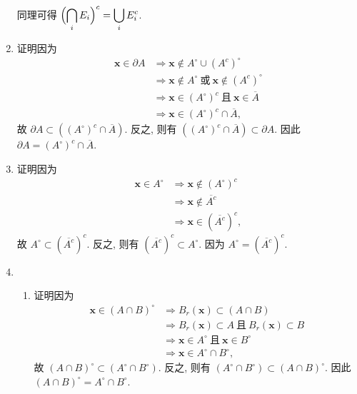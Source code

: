 \begin{enumerate}
        同理可得 $\displaystyle{\Bigl(\bigcap_i E_i\Bigr)^c = \bigcup_i E_i^c}$.
    \item %
        {\heiti 证明}\quad 因为
        \begin{align*}
            \boldsymbol{x} \in \partial{A} &\Rightarrow{} \boldsymbol{x} \notin A^\circ \cup (A^c)^\circ \\
            &\Rightarrow{} \boldsymbol{x} \notin A^\circ\ \text{或}\ \boldsymbol{x} \notin (A^c)^\circ \\
            &\Rightarrow{} \boldsymbol{x} \in (A^\circ)^c\ \text{且}\ \boldsymbol{x} \in \overline{A} \\
            &\Rightarrow{} \boldsymbol{x} \in (A^\circ)^c \cap \overline{A},
        \end{align*}
        故 $\partial{A} \subset ((A^\circ)^c \cap \overline{A})$. 反之, 则有 $((A^\circ)^c \cap \overline{A}) \subset \partial{A}$. 因此 $\partial{A} = (A^\circ)^c \cap \overline{A}$.
    \item %
        {\heiti 证明}\quad 因为
        \begin{align*}
            \boldsymbol{x} \in A^\circ &\Rightarrow \boldsymbol{x} \notin (A^\circ)^c \\
            &\Rightarrow \boldsymbol{x} \notin \overline{A^c} \\
            &\Rightarrow \boldsymbol{x} \in (\overline{A^c})^c,
        \end{align*}
        故 $A^\circ \subset (\overline{A^c})^c$. 反之, 则有 $(\overline{A^c})^c \subset A^\circ$. 因为 $A^\circ = (\overline{A^c})^c$.
    \item %
        \begin{enumerate}[(1)]
            \item %
                {\heiti 证明}\quad 因为
                \begin{align*}
                    \boldsymbol{x} \in (A \cap B)^\circ &\Rightarrow B_r(\boldsymbol{x}) \subset (A \cap B) \\
                    &\Rightarrow B_r(\boldsymbol{x}) \subset A\ \text{且}\ B_r(\boldsymbol{x}) \subset B \\
                    &\Rightarrow \boldsymbol{x} \in A^\circ\ \text{且}\ \boldsymbol{x} \in B^\circ \\
                    &\Rightarrow \boldsymbol{x} \in A^\circ \cap B^\circ,
                \end{align*}
                故 $(A \cap B)^\circ \subset (A^\circ \cap B^\circ)$. 反之, 则有 $(A^\circ \cap B^\circ) \subset (A \cap B)^\circ$. 因此 $(A \cap B)^\circ = A^\circ \cap B^\circ$.

\end{enumerate}
\end{enumerate}
